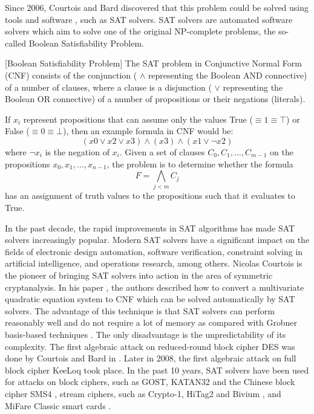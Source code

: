 Since 2006, Courtois and Bard discovered that this problem could be solved using tools and software \cite{courtois2007algebraicDES}, such as SAT solvers. SAT solvers are automated software solvers which aim to solve one of the original NP-complete problems, the so-called Boolean Satisfiability Problem. 
\begin{mydef} \label{def:booleanSat}[Boolean Satisfiability Problem] 
The SAT problem in Conjunctive Normal Form (CNF) consists of the conjunction ( $\wedge$  representing the Boolean AND connective) of a number of clauses, where a clause is a disjunction ( $\vee$ representing the Boolean OR connective) of a number of propositions or their negations (literals).

If $x_{i}$ represent propositions that can assume only the values True ($\equiv 1 \equiv \top$) or False ($\equiv 0 \equiv \bot$), then an example formula in CNF would be:
$$(x0 \vee x2 \vee x3) \wedge (x3) \wedge (x1 \vee \lnot x2)$$
where $\lnot x_{i}$ is the negation of $x_{i}$.
Given a set of clauses $C_{0}, C_{1}, ... , C_{m-1}$ on the propositions $x_{0}, x_{1}, ... , x_{n-1}$, the problem is to
determine whether the formula $$ F = \bigwedge_{j<m} C_{j}$$ has an assignment of truth values to the propositions such
that it evaluates to True.	
\end{mydef}
In the past decade, the rapid improvements in SAT algorithms has made SAT solvers increasingly popular. Modern SAT solvers have a significant impact on the fields of  electronic design automation, software verification, constraint solving in artificial intelligence, and operations research, among others.  Nicolas Courtois is the pioneer of bringing SAT solvers into action in the area of symmetric cryptanalysis. In his paper \cite{bard2007efficient}, the authors described how to convert a multivariate quadratic equation system to CNF which can be solved automatically by SAT solvers. The advantage of this technique is that SAT solvers can perform reasonably well and do not require a lot of memory as compared with Gr$\ddot{o}$bner basis-based techniques \cite{grobner}. The only disadvantage is the unpredictability of its complexity. The first algebraic attack on reduced-round block cipher DES was done by Courtois and Bard in  \cite{DEScourtois}. Later in 2008, the first algebraic attack on full block cipher KeeLoq \cite{courtois2008algebraicKeeLoq} took place. In the past 10 years, SAT solvers have been used for attacks on block ciphers, such as GOST\cite{courtois2012contradiction,gostac}, KATAN32 \cite{bard2010algebraic} and the Chinese block cipher SMS4 \cite{erickson2010algebraic},  stream ciphers, such as Crypto-1, HiTag2 and Bivium \cite{soos2009extending,courtois2009practical}, and MiFare Classic smart cards \cite{courtois2008algebraic}.

